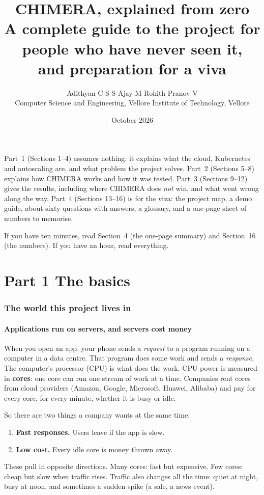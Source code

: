\documentclass[11pt,a4paper]{article}
\title{\textbf{CHIMERA, explained from zero}\\[4pt]
\large A complete guide to the project for people who have never seen it,\\
and preparation for a viva}
\author{Adithyan C S S \quad Ajay M \quad Rohith Pranov V\\[2pt]
\small Computer Science and Engineering, Vellore Institute of Technology, Vellore}
\date{October 2026}
\begin{document}
\maketitle

\begin{idea}
Part~1 (Sections 1--4) assumes nothing: it explains what the cloud, Kubernetes and
autoscaling are, and what problem the project solves. Part~2 (Sections 5--8) explains how
CHIMERA works and how it was tested. Part~3 (Sections 9--12) gives the results, including
where CHIMERA does \emph{not} win, and what went wrong along the way. Part~4 (Sections
13--16) is for the viva: the project map, a demo guide, about sixty questions with
answers, a glossary, and a one-page sheet of numbers to memorise.

If you have ten minutes, read Section~4 (the one-page summary) and Section~16 (the
numbers). If you have an hour, read everything.
\end{idea}

\tableofcontents
\newpage

\part*{Part 1 \quad The basics}

\section{The world this project lives in}

\subsection{Applications run on servers, and servers cost money}
When you open an app, your phone sends a \emph{request} to a program running on a
computer in a data centre. That program does some work and sends a \emph{response}. The
computer's processor (CPU) is what does the work. CPU power is measured in
\textbf{cores}: one core can run one stream of work at a time. Companies rent cores from
cloud providers (Amazon, Google, Microsoft, Huawei, Alibaba) and pay for every core, for
every minute, whether it is busy or idle.

So there are two things a company wants at the same time:
\begin{enumerate}
\item \textbf{Fast responses.} Users leave if the app is slow.
\item \textbf{Low cost.} Every idle core is money thrown away.
\end{enumerate}
These pull in opposite directions. Many cores: fast but expensive. Few cores: cheap but
slow when traffic rises. Traffic also changes all the time: quiet at night, busy at noon,
and sometimes a sudden spike (a sale, a news event).
\end{document}
